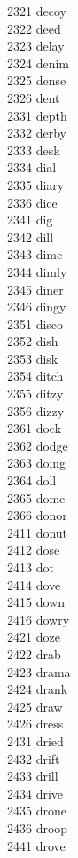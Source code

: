 2321 decoy \\
2322 deed \\
2323 delay \\
2324 denim \\
2325 dense \\
2326 dent \\
2331 depth \\
2332 derby \\
2333 desk \\
2334 dial \\
2335 diary \\
2336 dice \\
2341 dig \\
2342 dill \\
2343 dime \\
2344 dimly \\
2345 diner \\
2346 dingy \\
2351 disco \\
2352 dish \\
2353 disk \\
2354 ditch \\
2355 ditzy \\
2356 dizzy \\
2361 dock \\
2362 dodge \\
2363 doing \\
2364 doll \\
2365 dome \\
2366 donor \\
2411 donut \\
2412 dose \\
2413 dot \\
2414 dove \\
2415 down \\
2416 dowry \\
2421 doze \\
2422 drab \\
2423 drama \\
2424 drank \\
2425 draw \\
2426 dress \\
2431 dried \\
2432 drift \\
2433 drill \\
2434 drive \\
2435 drone \\
2436 droop \\
2441 drove \\
